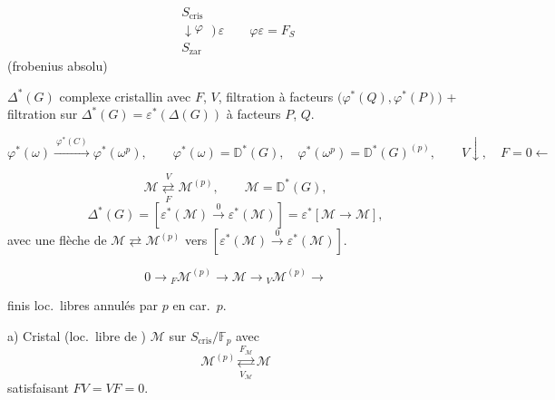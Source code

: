 \documentclass[11pt,a4paper]{article}
\begin{document}
\[
\begin{array}{c}
S_{\mathrm{cris}} \\ \downarrow \varphi \\ S_{\mathrm{zar}}
\end{array}
\ \Big)\,\varepsilon
\qquad \varphi\varepsilon = F_S
\]
(frobenius absolu)

$\Delta^*(G)$ complexe cristallin avec $F$, $V$, filtration à facteurs
$\bigl(\varphi^*(Q), \varphi^*(P)\bigr)$ + filtration sur
$\Delta^*(G) = \varepsilon^*(\Delta(G))$ à facteurs $P$, $Q$.

\[
\varphi^*(\omega) \xrightarrow{\ \varphi^*(C)\ } \varphi^*(\omega^{p}),
\qquad \varphi^*(\omega) = \mathbb{D}^*(G), \quad
\varphi^*(\omega^{p}) = \mathbb{D}^*(G)^{(p)},
\qquad V \downarrow, \quad F = 0 \leftarrow
\]

\[
\mathcal{M} \underset{F}{\overset{V}{\rightleftarrows}} \mathcal{M}^{(p)},
\qquad \mathcal{M} = \mathbb{D}^*(G),
\]
\[
\Delta^*(G) = [\varepsilon^*(\mathcal{M}) \xrightarrow{0} \varepsilon^*(\mathcal{M})]
= \varepsilon^*[\mathcal{M} \to \mathcal{M}],
\]
avec une flèche de $\mathcal{M} \rightleftarrows \mathcal{M}^{(p)}$ vers
$[\varepsilon^*(\mathcal{M}) \xrightarrow{0} \varepsilon^*(\mathcal{M})]$.



\[
0 \to {}_F\mathcal{M}^{(p)} \to \mathcal{M} \to {}_V\mathcal{M}^{(p)} \to
\]


\struck{\ill{}}  finis loc.\ libres annulés par $p$ en car.\ $p$.

a) Cristal (loc.\ libre de ) $\mathcal{M}$ sur
$S_{\mathrm{cris}}/\mathbb{F}_p$ avec
\[
\mathcal{M}^{(p)} \underset{V_{\mathcal{M}}}{\overset{F_{\mathcal{M}}}{\rightleftarrows}} \mathcal{M}
\]
satisfaisant $FV = VF = 0$.
\end{document}
